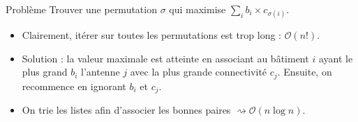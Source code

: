 \begin{frame}
    \frametitle{\problemtitle}
    \begin{block}{Problème}
        Trouver une permutation $\sigma$ qui maximise $\sum_{i} b_i \times c_{\sigma(i)}$.
    \end{block}
    \pause
    \begin{itemize}
        \item<+-> Clairement, itérer sur toutes les permutations est trop long : $\mathcal{O}(n!)$.
        \item<+-> Solution : la valeur maximale est atteinte en associant au bâtiment $i$ ayant le plus grand $b_i$ l'antenne $j$ avec la plus grande connectivité $c_j$. Ensuite, on recommence en ignorant $b_i$ et $c_j$.
        \item<+-> On trie les listes afin d'associer les bonnes paires $\rightsquigarrow \mathcal{O}(n \log n)$.
    \end{itemize}
    \solvestats
\end{frame}
